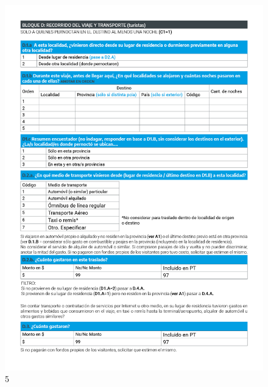 \documentclass[
]{book}
\begin{document}
\begin{figure}
\includegraphics[width=17.22in]{imagenes/graf05} \caption{5}\label{fig:005}
\end{figure}
\end{document}

